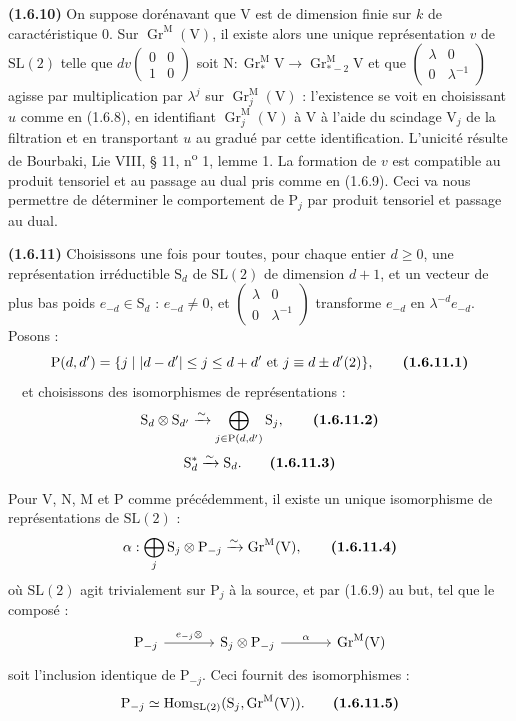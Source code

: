 \documentclass[11pt,leqno]{article}
\newcommand{\Page}[1]{\ifvmode\noindent\else\unskip\ \fi{\footnotesize\textcolor{gray}{[p.\,#1]}}\ \ignorespaces}
\begin{document}
\textbf{(1.6.10)} On suppose dorénavant que \(\mathrm{V}\) est de dimension finie sur \(k\) de caractéristique \(0\). Sur \(\operatorname{Gr}^{\mathrm{M}}(\mathrm{V})\), il existe alors une unique représentation \(v\) de \(\mathrm{SL}(2)\) telle que \(dv\begin{pmatrix}0&0\\1&0\end{pmatrix}\) soit \(\mathrm{N}:\operatorname{Gr}_*^{\mathrm{M}}\mathrm{V}\to\operatorname{Gr}_{*-2}^{\mathrm{M}}\mathrm{V}\) et que \(\begin{pmatrix}\lambda&0\\0&\lambda^{-1}\end{pmatrix}\) agisse par multiplication par \(\lambda^j\) sur \(\operatorname{Gr}_j^{\mathrm{M}}(\mathrm{V})\) : l’existence se voit en choisissant \(u\) comme en (1.6.8), en identifiant \(\operatorname{Gr}_j^{\mathrm{M}}(\mathrm{V})\) à \(\mathrm{V}\) à l’aide du scindage \(\mathrm{V}_j\) de la filtration et en transportant \(u\) au gradué par cette identification. L’unicité résulte de Bourbaki, Lie VIII, § 11, n\textsuperscript{o} 1, lemme 1. La formation de \(v\) est compatible au produit tensoriel et au passage au dual pris comme en (1.6.9). Ceci va nous permettre de déterminer le comportement de \(\mathrm{P}_j\) par produit tensoriel et passage au dual.

\textbf{(1.6.11)} Choisissons une fois pour toutes, pour chaque entier \(d\ge0\), une représentation irréductible \(\mathrm{S}_d\) de \(\mathrm{SL}(2)\) de dimension \(d+1\), et un vecteur de plus bas poids \(e_{-d}\in\mathrm{S}_d\) : \(e_{-d}\ne0\), et \(\begin{pmatrix}\lambda&0\\0&\lambda^{-1}\end{pmatrix}\) transforme \(e_{-d}\) en \(\lambda^{-d}e_{-d}\). Posons :
\[
\mathrm{P}(d,d')=\{j\mid |d-d'|\le j\le d+d'\text{ et }j\equiv d\pm d'(2)\},
\tag*{\textbf{(1.6.11.1)}}
\]
\Page{168}et choisissons des isomorphismes de représentations :
\[
\mathrm{S}_d\otimes\mathrm{S}_{d'}
\xrightarrow{\sim}
\bigoplus_{j\in\mathrm{P}(d,d')}\mathrm{S}_j,
\tag*{\textbf{(1.6.11.2)}}
\]
\[
\mathrm{S}_d^*\xrightarrow{\sim}\mathrm{S}_d.
\tag*{\textbf{(1.6.11.3)}}
\]

Pour \(\mathrm{V}\), \(\mathrm{N}\), \(\mathrm{M}\) et \(\mathrm{P}\) comme précédemment, il existe un unique isomorphisme de représentations de \(\mathrm{SL}(2)\) :
\[
\alpha:\bigoplus_j\mathrm{S}_j\otimes\mathrm{P}_{-j}
\xrightarrow{\sim}\operatorname{Gr}^{\mathrm{M}}(\mathrm{V}),
\tag*{\textbf{(1.6.11.4)}}
\]
où \(\mathrm{SL}(2)\) agit trivialement sur \(\mathrm{P}_j\) à la source, et par (1.6.9) au but, tel que le composé :
\[
\begin{tikzcd}[ampersand replacement=\&,column sep=large]
\mathrm{P}_{-j}
  \arrow[r,"{e_{-j}\otimes}"]
  \& \mathrm{S}_j\otimes\mathrm{P}_{-j}
  \arrow[r,"\alpha"]
  \& \operatorname{Gr}^{\mathrm{M}}(\mathrm{V})
\end{tikzcd}
\]
soit l’inclusion identique de \(\mathrm{P}_{-j}\). Ceci fournit des isomorphismes :
\[
\mathrm{P}_{-j}\simeq
\operatorname{Hom}_{\mathrm{SL}(2)}
(\mathrm{S}_j,\operatorname{Gr}^{\mathrm{M}}(\mathrm{V})).
\tag*{\textbf{(1.6.11.5)}}
\]
\end{document}
